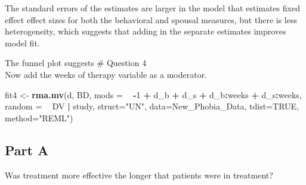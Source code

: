 \documentclass[]{article}
\newenvironment{Shaded}{\begin{snugshade}}{\end{snugshade}}
\newcommand{\KeywordTok}[1]{\textcolor[rgb]{0.13,0.29,0.53}{\textbf{#1}}}
\newcommand{\DataTypeTok}[1]{\textcolor[rgb]{0.13,0.29,0.53}{#1}}
\newcommand{\DecValTok}[1]{\textcolor[rgb]{0.00,0.00,0.81}{#1}}
\newcommand{\StringTok}[1]{\textcolor[rgb]{0.31,0.60,0.02}{#1}}
\newcommand{\OtherTok}[1]{\textcolor[rgb]{0.56,0.35,0.01}{#1}}
\newcommand{\OperatorTok}[1]{\textcolor[rgb]{0.81,0.36,0.00}{\textbf{#1}}}
\newcommand{\NormalTok}[1]{#1}
\begin{document}
The standard errors of the estimates are larger in the model that
estimates fixed effect effect sizes for both the behavioral and spousal
measures, but there is less heterogeneity, which suggests that adding in
the separate estimates improves model fit.

The funnel plot suggests \# Question 4\\
Now add the weeks of therapy variable as a moderator.

\begin{Shaded}
\begin{Highlighting}[]
\NormalTok{fit4 <-}\StringTok{ }\KeywordTok{rma.mv}\NormalTok{(d, BD, }\DataTypeTok{mods =} \OperatorTok{~}\StringTok{ }\OperatorTok{-}\DecValTok{1} \OperatorTok{+}\StringTok{ }\NormalTok{d_b }\OperatorTok{+}\StringTok{ }\NormalTok{d_s }\OperatorTok{+}\StringTok{ }\NormalTok{d_b}\OperatorTok{:}\NormalTok{weeks }\OperatorTok{+}\StringTok{ }\NormalTok{d_s}\OperatorTok{:}\NormalTok{weeks, }\DataTypeTok{random =} \OperatorTok{~}\StringTok{ }\NormalTok{DV }\OperatorTok{|}\StringTok{ }\NormalTok{study, }\DataTypeTok{struct=}\StringTok{"UN"}\NormalTok{, }\DataTypeTok{data=}\NormalTok{New_Phobia_Data, }\DataTypeTok{tdist=}\OtherTok{TRUE}\NormalTok{, }\DataTypeTok{method=}\StringTok{"REML"}\NormalTok{)}
\end{Highlighting}
\end{Shaded}

\subsection{Part A}\label{part-a-3}

Was treatment more effective the longer that patients were in treatment?

\begin{Shaded}
\end{Shaded}
\end{document}
